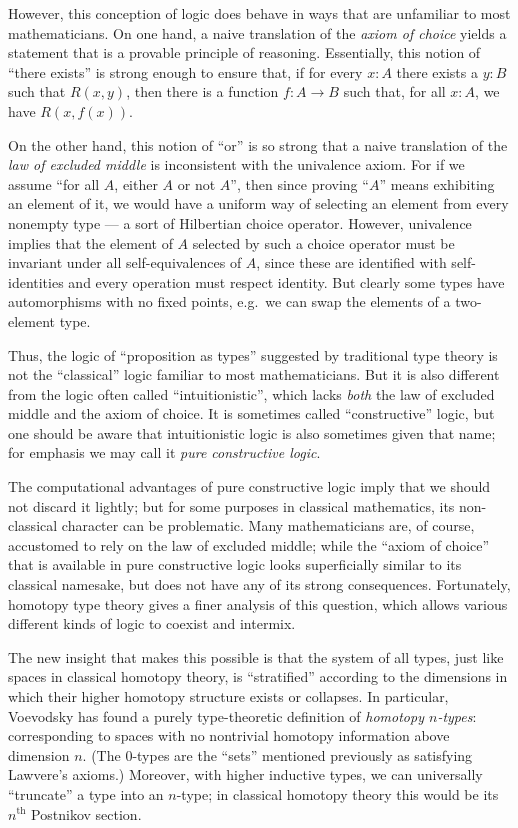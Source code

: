 However, this conception of logic does behave in ways that are unfamiliar to most mathematicians.
On one hand, a naive translation of the \emph{axiom of choice} yields a statement that is a provable principle of reasoning.
Essentially, this notion of ``there exists'' is strong enough to ensure that, if for every $x: A$ there exists a $y:B$ such that $R(x,y)$, then there is a function $f : A\to B$ such that, for all $x:A$, we have $R(x, f(x))$.

On the other hand, this notion of ``or'' is so strong that a naive translation of the \emph{law of excluded middle} is inconsistent with the univalence axiom.
For if we assume ``for all $A$, either $A$ or not $A$'', then since proving ``$A$'' means exhibiting an element of it, we would have a uniform way of selecting an element from every nonempty type --- a sort of Hilbertian choice operator.
However, univalence implies that the element of $A$ selected by such a choice operator must be invariant under all self-equivalences of $A$, since these are identified with self-identities and every operation must respect identity.
But clearly some types have automorphisms with no fixed points, e.g.\ we can swap the elements of a two-element type.

Thus, the logic of ``proposition as types'' suggested by traditional type theory is not the ``classical'' logic familiar to most mathematicians.
But it is also different from the logic often called ``intuitionistic'', which lacks \emph{both} the law of excluded middle and the axiom of choice.
It is sometimes called ``constructive'' logic, but one should be aware that intuitionistic logic is also sometimes given that name; for emphasis we may call it \emph{pure constructive logic}.

The computational advantages of pure constructive logic imply that we should not  discard it lightly; but for some purposes in classical mathematics, its non-classical character can be problematic.
Many mathematicians are, of course, accustomed to rely on the law of excluded middle; while the ``axiom of choice'' that is available in pure constructive logic looks superficially similar to its classical namesake, but does not have any of its strong consequences.
Fortunately, homotopy type theory gives a finer analysis of this question, which allows various different kinds of logic to coexist and intermix.

The new insight that makes this possible is that the system of all types, just like spaces in classical homotopy theory, is ``stratified'' according to the dimensions in which their higher homotopy structure exists or collapses.
In particular, Voevodsky has found a purely type-theoretic definition of \emph{homotopy $n$-types}: corresponding to spaces with no nontrivial homotopy information above dimension $n$.
(The $0$-types are the ``sets'' mentioned previously as satisfying Lawvere's axioms.)
Moreover, with higher inductive types, we can universally ``truncate'' a type into an $n$-type; in classical homotopy theory this would be its $n^{\mathrm{th}}$ Postnikov section.

